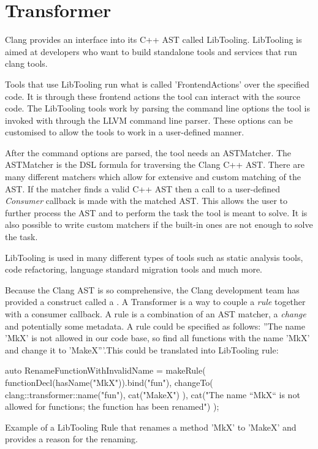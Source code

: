 \section{Transformer}

Clang provides an interface into its C++ AST called LibTooling. LibTooling is aimed at developers who want to build standalone tools and services that run clang tools.\cite{llvmLibToolingClang17}

Tools that use LibTooling run what is called 'FrontendActions' over the specified code. It is through these frontend actions the tool can interact with the source code. The LibTooling tools work by parsing the command line options the tool is invoked with through the LLVM command line parser. These options can be customised to allow the tools to work in a user-defined manner. 

After the command options are parsed, the tool needs an ASTMatcher. The ASTMatcher is the DSL formula for traversing the Clang C++ AST. There are many different matchers which allow for extensive and custom matching of the AST.\cite{ASTMatcherReference,MatchingClangAST} If the matcher finds a valid C++ AST then a call to a user-defined \textit{Consumer} callback is made with the matched AST. This allows the user to further process the AST and to perform the task the tool is meant to solve.
It is also possible to write custom matchers if the built-in ones are not enough to solve the task.

LibTooling is used in many different types of tools such as static analysis tools, code refactoring, language standard migration tools and much more.\cite{ExternalClangExamples}

Because the Clang AST is so comprehensive, the Clang development team has provided a construct called a . A Transformer is a way to couple a \textit{rule} together with a consumer callback. A rule is a combination of an AST matcher, a \textit{change} and potentially some metadata. A rule could be specified as follows: ''The name 'MkX' is not allowed in our code base, so find all functions with the name 'MkX' and change it to 'MakeX'''.This could be translated into LibTooling rule:

\begin{listing}[H]
    \begin{cppcode}
auto RenameFunctionWithInvalidName = makeRule(
    functionDecl(hasName("MkX")).bind("fun"), 
    changeTo(
        clang::transformer::name("fun"), 
        cat("MakeX")
    ),
    cat("The name ``MkX`` is not allowed for functions; the function has been renamed")
);
    \end{cppcode}
    \caption{Example of a LibTooling Rule that renames a method 'MkX' to 'MakeX' and provides a reason for the renaming.}
    \label{code:080dev:TransformerRuleExample}
\end{listing}

